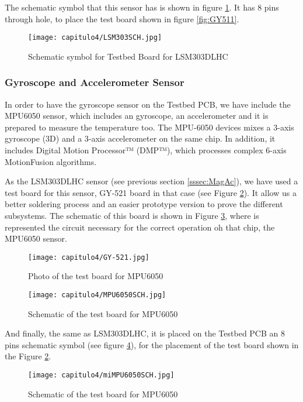 The schematic symbol that this sensor has is shown in figure \ref{fig:LSM303SCH}. It has 8 pins through hole, to place the test board shown in figure \ref{fig:GY511}. 

  
\begin{figure}[H]
	\centering
		\texttt{[image: capitulo4/LSM303SCH.jpg]}
	\caption{Schematic symbol for Testbed Board for LSM303DLHC}
	\label{fig:LSM303SCH}
\end{figure}

\subsubsection{Gyroscope and Accelerometer Sensor} \label{sssec:GyrAc}

In order to have the gyroscope sensor on the Testbed \acrshort{PCB}, we have include the MPU6050 sensor, which includes an gyroscope, an accelerometer and it is prepared to measure the temperature too. The MPU-6050 devices mixes a 3-axis gyroscope (3D) and a 3-axis accelerometer on the same chip. In addition, it includes Digital Motion Processor™ (DMP™), which processes complex 6-axis MotionFusion algorithms. \cite{MPUinfo}

As the LSM303DLHC sensor (see previous section \ref{sssec:MagAc}), we have used a test board for this sensor, GY-521 board in that case (see Figure \ref{fig:MPU6050photo}). It allow us a better soldering process and an easier prototype version to prove the different subsystems. The schematic of this board is shown in Figure \ref{fig:MPUsch}, where is represented the circuit necessary for the correct operation oh that chip, the MPU6050 sensor. 


\begin{figure}[H]
	\centering
		\texttt{[image: capitulo4/GY-521.jpg]}
	\caption{Photo of the test board for MPU6050}
	\label{fig:MPU6050photo}
\end{figure}

  
\begin{figure}[H]
	\centering
		\texttt{[image: capitulo4/MPU6050SCH.jpg]}
	\caption{Schematic of the test board for MPU6050 }
	\label{fig:MPUsch}
\end{figure}


And finally, the same as LSM303DLHC, it is placed on the Testbed \acrshort{PCB} an 8 pins schematic symbol (see figure \ref{fig:miMPU6050SCH}), for the placement of the test board shown in the Figure \ref{fig:MPU6050photo}.

  
\begin{figure}[H]
	\centering
		\texttt{[image: capitulo4/miMPU6050SCH.jpg]}
	\caption{Schematic of the test board for MPU6050 \cite{boardMPU}}
	\label{fig:miMPU6050SCH}
\end{figure}

